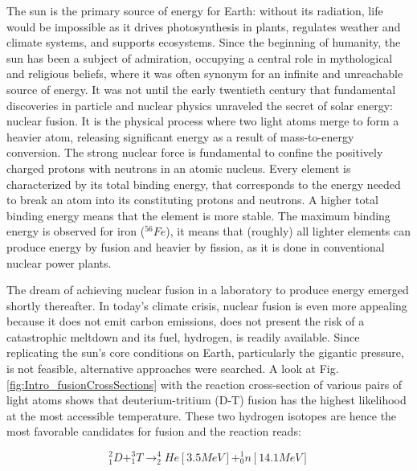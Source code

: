 The sun is the primary source of energy for Earth: without its radiation, life would be impossible as it drives photosynthesis in plants, regulates weather and climate systems, and supports ecosystems. Since the beginning of humanity, the sun has been a subject of admiration, occupying a central role in mythological and religious beliefs, where it was often synonym for an infinite and unreachable source of energy. It was not until the early twentieth century that fundamental discoveries in particle and nuclear physics unraveled the secret of solar energy: nuclear fusion. It is the physical process where two light atoms merge to form a heavier atom, releasing significant energy as a result of mass-to-energy conversion. The strong nuclear force is fundamental to confine the positively charged protons with neutrons in an atomic nucleus. Every element is characterized by its total binding energy, that corresponds to the energy needed to break an atom into its constituting protons and neutrons. A higher total binding energy means that the element is more stable. The maximum binding energy is observed for iron ($^{56}Fe$), it means that (roughly) all lighter elements can produce energy by fusion and heavier by fission, as it is done in conventional nuclear power plants.  \newline 

The dream of achieving nuclear fusion in a laboratory to produce energy emerged shortly thereafter. In today's climate crisis, nuclear fusion is even more appealing because it does not emit carbon emissions, does not present the risk of a catastrophic meltdown and its fuel, hydrogen, is readily available. Since replicating the sun's core conditions on Earth, particularly the gigantic pressure, is not feasible, alternative approaches were searched. A look at Fig. \ref{fig:Intro_fusionCrossSections} with the reaction cross-section of various pairs of light atoms shows that deuterium-tritium (D-T) fusion has the highest likelihood at the most accessible temperature. These two hydrogen isotopes are hence the most favorable candidates for fusion and the reaction reads: \newline

\begin{equation}
	^2_1D + ^3_1T \rightarrow ^4_2He [3.5MeV] + ^1_0n [14.1 MeV]
\end{equation}

